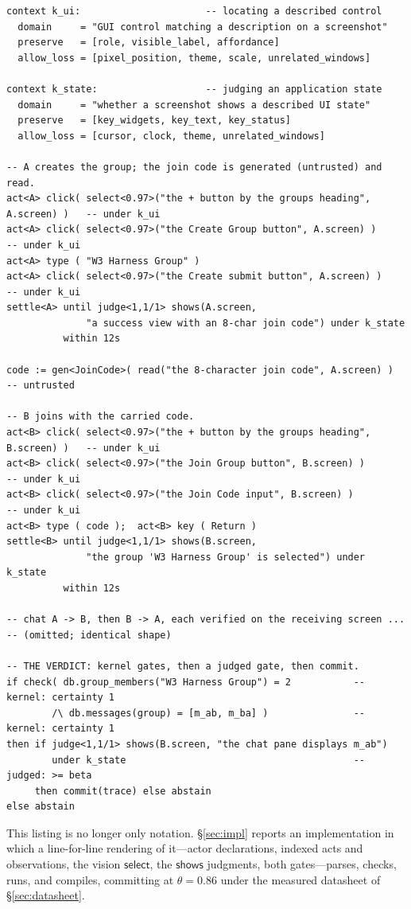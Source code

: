 \documentclass[acmsmall,screen,nonacm]{acmart}
\newcommand{\select}{\mathsf{select}}
\newcommand{\conf}{\theta}
\theoremstyle{acmdefinition}%
\theoremstyle{acmplain}%
\begin{document}
\begin{lstlisting}
context k_ui:                      -- locating a described control
  domain     = "GUI control matching a description on a screenshot"
  preserve   = [role, visible_label, affordance]
  allow_loss = [pixel_position, theme, scale, unrelated_windows]

context k_state:                   -- judging an application state
  domain     = "whether a screenshot shows a described UI state"
  preserve   = [key_widgets, key_text, key_status]
  allow_loss = [cursor, clock, theme, unrelated_windows]

-- A creates the group; the join code is generated (untrusted) and read.
act<A> click( select<0.97>("the + button by the groups heading", A.screen) )   -- under k_ui
act<A> click( select<0.97>("the Create Group button", A.screen) )               -- under k_ui
act<A> type ( "W3 Harness Group" )
act<A> click( select<0.97>("the Create submit button", A.screen) )              -- under k_ui
settle<A> until judge<1,1/1> shows(A.screen,
              "a success view with an 8-char join code") under k_state
          within 12s

code := gen<JoinCode>( read("the 8-character join code", A.screen) )   -- untrusted

-- B joins with the carried code.
act<B> click( select<0.97>("the + button by the groups heading", B.screen) )   -- under k_ui
act<B> click( select<0.97>("the Join Group button", B.screen) )                 -- under k_ui
act<B> click( select<0.97>("the Join Code input", B.screen) )                   -- under k_ui
act<B> type ( code );  act<B> key ( Return )
settle<B> until judge<1,1/1> shows(B.screen,
              "the group 'W3 Harness Group' is selected") under k_state
          within 12s

-- chat A -> B, then B -> A, each verified on the receiving screen ...
-- (omitted; identical shape)

-- THE VERDICT: kernel gates, then a judged gate, then commit.
if check( db.group_members("W3 Harness Group") = 2           -- kernel: certainty 1
        /\ db.messages(group) = [m_ab, m_ba] )               -- kernel: certainty 1
then if judge<1,1/1> shows(B.screen, "the chat pane displays m_ab")
        under k_state                                        -- judged: >= beta
     then commit(trace) else abstain
else abstain
\end{lstlisting}

This listing is no longer only notation. \S\ref{sec:impl} reports an
implementation in which a line-for-line rendering of it---actor
declarations, indexed acts and observations, the vision $\select$, the
$\mathsf{shows}$ judgments, both gates---parses, checks, runs, and
compiles, committing at $\conf=0.86$ under the measured datasheet of
\S\ref{sec:datasheet}.
\end{document}
